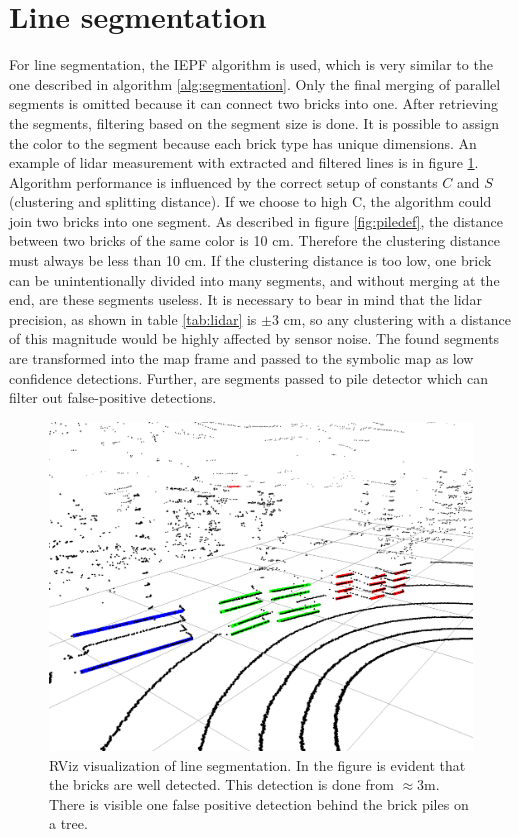 \section{Line segmentation}
For line segmentation, the IEPF algorithm is used, which is very similar to the one described in algorithm \ref{alg:segmentation}. Only the final merging of parallel segments is omitted because it can connect two bricks into one. After retrieving the segments, filtering based on the segment size is done. It is possible to assign the color to the segment because each brick type has unique dimensions. An example of lidar measurement with extracted and filtered lines is in figure \ref{fig:segments}. Algorithm performance is influenced by the correct setup of constants $C$ and $S$ (clustering and splitting distance). If we choose to high C, the algorithm could join two bricks into one segment. As described in figure \ref{fig:piledef}, the distance between two bricks of the same color is 10 cm. Therefore the clustering distance must always be less than 10 cm. If the clustering distance is too low, one brick can be unintentionally divided into many segments, and without merging at the end, are these segments useless. It is necessary to bear in mind that the lidar precision, as shown in table \ref{tab:lidar} is $\pm3$ cm, so any clustering with a distance of this magnitude would be highly affected by sensor noise. The found segments are transformed into the map frame and passed to the symbolic map as low confidence detections. Further, are segments passed to pile detector which can filter out false-positive detections.

\hspace{8mm}

\begin{figure}[H]
\centering
\includegraphics[scale=0.43]{fig/segments}
\caption[Line segmentation visualization]{RViz visualization of line segmentation. In the figure is evident that the bricks are well detected. This detection is done from $\approx3$m. There is visible one false positive detection behind the brick piles on a tree.}
\label{fig:segments}
\end{figure}


